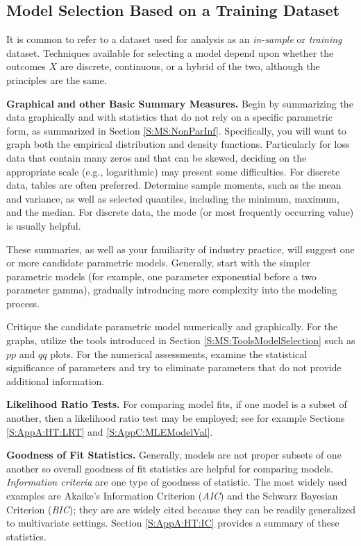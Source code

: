 \documentclass[]{book}
\theoremstyle{definition}
\theoremstyle{definition}
\theoremstyle{definition}
\theoremstyle{remark}
\begin{document}
\subsection{Model Selection Based on a Training
Dataset}\label{model-selection-based-on-a-training-dataset}

It is common to refer to a dataset used for analysis as an
\emph{in-sample} or \emph{training} dataset. Techniques available for
selecting a model depend upon whether the outcomes \(X\) are discrete,
continuous, or a hybrid of the two, although the principles are the
same.

\textbf{Graphical and other Basic Summary Measures.} Begin by
summarizing the data graphically and with statistics that do not rely on
a specific parametric form, as summarized in Section
\ref{S:MS:NonParInf}. Specifically, you will want to graph both the
empirical distribution and density functions. Particularly for loss data
that contain many zeros and that can be skewed, deciding on the
appropriate scale (e.g., logarithmic) may present some difficulties. For
discrete data, tables are often preferred. Determine sample moments,
such as the mean and variance, as well as selected quantiles, including
the minimum, maximum, and the median. For discrete data, the mode (or
most frequently occurring value) is usually helpful.

These summaries, as well as your familiarity of industry practice, will
suggest one or more candidate parametric models. Generally, start with
the simpler parametric models (for example, one parameter exponential
before a two parameter gamma), gradually introducing more complexity
into the modeling process.

Critique the candidate parametric model numerically and graphically. For
the graphs, utilize the tools introduced in Section
\ref{S:MS:ToolsModelSelection} such as \(pp\) and \(qq\) plots. For the
numerical assessments, examine the statistical significance of
parameters and try to eliminate parameters that do not provide
additional information.

\textbf{Likelihood Ratio Tests.} For comparing model fits, if one model
is a subset of another, then a likelihood ratio test may be employed;
see for example Sections \ref{S:AppA:HT:LRT} and
\ref{S:AppC:MLEModelVal}.

\textbf{Goodness of Fit Statistics.} Generally, models are not proper
subsets of one another so overall goodness of fit statistics are helpful
for comparing models. \emph{Information criteria} are one type of
goodness of statistic. The most widely used examples are Akaike's
Information Criterion (\emph{AIC}) and the Schwarz Bayesian Criterion
(\emph{BIC}); they are are widely cited because they can be readily
generalized to multivariate settings. Section \ref{S:AppA:HT:IC}
provides a summary of these statistics.
\end{document}
